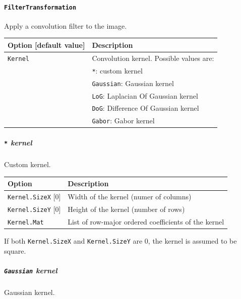 \documentclass[a4paper,11pt,oneside]{article}
\begin{document}
\paragraph{\texorpdfstring{%
\lstinline[basicstyle=\ttfamily\bfseries]!FilterTransformation!}
{FilterTransformation}}
Apply a convolution filter to the image.

\begin{center}
 \begin{tabular}{| p{5cm} | p{10cm} | }
 \hline
 Option [default value] & Description\\
 \hline\hline
  \cellcolor{requiredcolor}\lstinline!Kernel! & Convolution kernel.
  Possible values are: \\
   & \lstinline!*!: custom kernel \\
   & \lstinline!Gaussian!: Gaussian kernel \\
   & \lstinline!LoG!: Laplacian Of Gaussian kernel \\
   & \lstinline!DoG!: Difference Of Gaussian kernel \\
   & \lstinline!Gabor!: Gabor kernel \\
 \hline
\end{tabular}
\end{center}


\subparagraph{\texorpdfstring{%
\lstinline[basicstyle=\ttfamily\bfseries]!*! kernel}{* kernel}}
Custom kernel.

\begin{center}
 \begin{tabular}{| m{4cm} | m{7cm} | }
 \hline
 Option & Description\\
 \hline\hline
  \lstinline!Kernel.SizeX! [0] & Width of the kernel (numer of columns)\\
  \lstinline!Kernel.SizeY! [0] & Height of the kernel (number of rows)\\
  \cellcolor{requiredcolor}\lstinline!Kernel.Mat! & List of row-major ordered
   coefficients of the kernel\\
 \hline
\end{tabular}
\end{center}

If both \lstinline!Kernel.SizeX! and \lstinline!Kernel.SizeY! are 0, the kernel
 is assumed to be square.


\subparagraph{\texorpdfstring{%
\lstinline[basicstyle=\ttfamily\bfseries]!Gaussian! kernel}{Gaussian kernel}}
Gaussian kernel.
\end{document}
